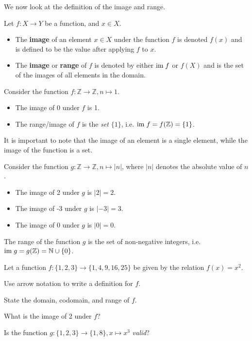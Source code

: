 We now look at the definition of the image and range.
\begin{definition}
    Let $f: X \to Y$ be a function, and $x \in X$.
    \begin{itemize}
        \item The \textbf{image} of an element $x \in X$ under the function $f$ is denoted $f(x)$ and is defined to be the value after applying $f$ to $x$.
        \item The \textbf{image} or \textbf{range} of $f$ is denoted by either $\mathrm{im}\; f$ or $f(X)$ and is the set of the images of all elements in the domain.
    \end{itemize}
\end{definition}
\begin{example}
    Consider the function $f: \mathbb{Z} \to \mathbb{Z}, n \mapsto 1$.
    \begin{itemize}
        \item The image of 0 under $f$ is 1.
        \item The range/image of $f$ is the \textit{set} $\{1\}$, i.e. $\mathrm{im}\; f = f(\mathbb{Z}) = \{1\}$.
    \end{itemize}
    It is important to note that the image of an element is a single element, while the image of the function is a set.
\end{example}
\begin{example}
    Consider the function $g: \mathbb{Z} \to \mathbb{Z}, n \mapsto |n|$, where $|n|$ denotes the absolute value of $n$.
    \begin{itemize}
        \item The image of 2 under $g$ is $|2| = 2$.
        \item The image of -3 under $g$ is $|-3| = 3$.
        \item The image of 0 under $g$ is $|0| = 0$.
    \end{itemize}
    The range of the function $g$ is the set of non-negative integers, i.e. $\mathrm{im}\; g = g(\mathbb{Z}) = \mathbb{N} \cup \{0\}$.
\end{example}

\begin{exercise}
    Let a function $f: \{1, 2, 3\} \to \{1, 4, 9, 16, 25\}$ be given by the relation $f(x) = x^2$.
    \begin{partquestions}{\roman*}
        \item Use arrow notation to write a definition for $f$.
        \item State the domain, codomain, and range of $f$.
        \item What is the image of 2 under $f$?
        \item Is the function $g: \{1, 2, 3\} \to \{1, 8\}, x \mapsto x^3$ \textit{valid}?
    \end{partquestions}
\end{exercise}

